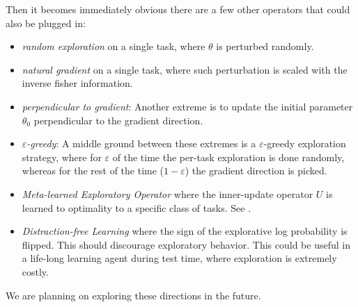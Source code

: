 \documentclass{article} %
\begin{document}
Then it becomes immediately obvious there are a few other operators that could also be plugged in:
\begin{itemize}
    \item \emph{random exploration} on a single task, where $\theta$ is perturbed randomly.
    \item \emph{natural gradient} on a single task, where such perturbation is scaled with the inverse fisher information.
    \item \emph{perpendicular to gradient}: Another extreme is to update the initial parameter $\theta_0$ perpendicular to the gradient direction. 
    \item \emph{$\varepsilon$-greedy}: A middle ground between these extremes is a $\varepsilon$-greedy exploration strategy, where for $\varepsilon$ of the time the per-task exploration is done randomly, whereas for the rest of the time ($1-\varepsilon$) the gradient direction is picked.
    \item \emph{Meta-learned Exploratory Operator} where the inner-update operator $U$ is learned to optimality to a specific class of tasks. See \cite{schex5, schex6}.
    \item \emph{Distraction-free Learning} where the sign of the explorative log probability is flipped. This should discourage exploratory behavior. This could be useful in a life-long learning agent during test time, where exploration is extremely costly.
\end{itemize}

We are planning on exploring these directions in the future.



\end{document}
